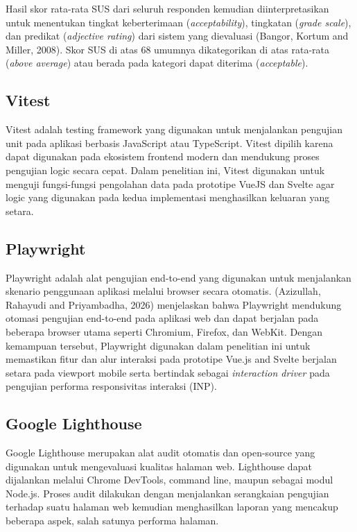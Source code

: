 \documentclass[12pt,a4paper]{report}
\begin{document}
Hasil skor rata-rata SUS dari seluruh responden kemudian diinterpretasikan untuk menentukan tingkat keberterimaan (\textit{acceptability}), tingkatan (\textit{grade scale}), dan predikat (\textit{adjective rating}) dari sistem yang dievaluasi (Bangor, Kortum and Miller, 2008). Skor SUS di atas 68 umumnya dikategorikan di atas rata-rata (\textit{above average}) atau berada pada kategori dapat diterima (\textit{acceptable}).

\subsection{Vitest}
Vitest adalah testing framework yang digunakan untuk menjalankan pengujian unit pada aplikasi berbasis JavaScript atau TypeScript. Vitest dipilih karena dapat digunakan pada ekosistem frontend modern dan mendukung proses pengujian logic secara cepat. Dalam penelitian ini, Vitest digunakan untuk menguji fungsi-fungsi pengolahan data pada prototipe VueJS dan Svelte agar logic yang digunakan pada kedua implementasi menghasilkan keluaran yang setara.

\subsection{Playwright}
Playwright adalah alat pengujian end-to-end yang digunakan untuk menjalankan skenario penggunaan aplikasi melalui browser secara otomatis. (Azizullah, Rahayudi and Priyambadha, 2026) menjelaskan bahwa Playwright mendukung otomasi pengujian end-to-end pada aplikasi web dan dapat berjalan pada beberapa browser utama seperti Chromium, Firefox, dan WebKit. Dengan kemampuan tersebut, Playwright digunakan dalam penelitian ini untuk memastikan fitur dan alur interaksi pada prototipe Vue.js and Svelte berjalan setara pada viewport mobile serta bertindak sebagai \textit{interaction driver} pada pengujian performa responsivitas interaksi (INP).

\subsection{Google Lighthouse}
Google Lighthouse merupakan alat audit otomatis dan open-source yang digunakan untuk mengevaluasi kualitas halaman web. Lighthouse dapat dijalankan melalui Chrome DevTools, command line, maupun sebagai modul Node.js. Proses audit dilakukan dengan menjalankan serangkaian pengujian terhadap suatu halaman web kemudian menghasilkan laporan yang mencakup beberapa aspek, salah satunya performa halaman.
\end{document}
